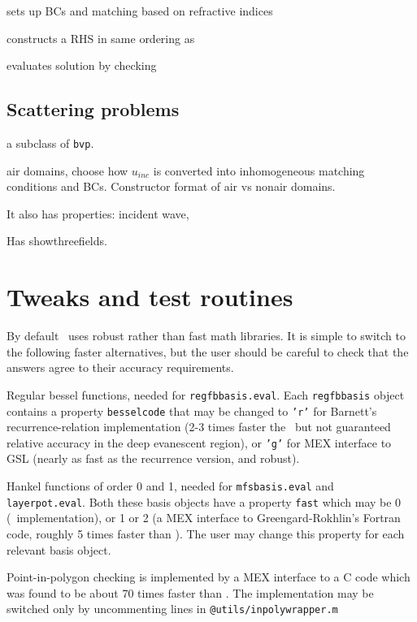 \documentclass[12pt]{article}
\begin{document}
sets up BCs and matching based on refractive indices

constructs a RHS in same ordering as 

evaluates solution by checking 

\subsection{Scattering problems}

a subclass of {\tt bvp}.

air domains, choose how $u_{inc}$ is converted into
inhomogeneous matching conditions and BCs.
Constructor format of air vs nonair domains.

It also has properties: incident wave, 

Has showthreefields.


\section{Tweaks and test routines}

By default \mpspack\ uses robust rather than fast math libraries.
It is simple to switch to the following
faster alternatives, but the user should be careful
to check that the answers agree to their accuracy requirements.
\ben
\item Regular bessel functions, needed for {\tt regfbbasis.eval}.
Each {\tt regfbbasis} object contains a property {\tt besselcode}
that may be changed to {\tt 'r'} for Barnett's recurrence-relation
implementation (2-3 times faster the \matlab\ but
not guaranteed relative accuracy in
the deep evanescent region),
or {\tt 'g'} for MEX interface to GSL (nearly as fast as the recurrence
version, and robust).

\item Hankel functions of order 0 and 1, needed for
{\tt mfsbasis.eval} and {\tt layerpot.eval}. Both these basis objects
have a property {\tt fast} which may be 0 (\matlab\ implementation),
or 1 or 2 (a MEX interface to Greengard-Rokhlin's Fortran code,
roughly 5 times faster than \matlab).
The user may change this property for each relevant basis object.

\item Point-in-polygon checking is implemented by a MEX interface
to a C code which was found to be about 70 times faster than
\matlab. The implementation
may be switched only by uncommenting lines
in {\tt @utils/inpolywrapper.m}
\een
\end{document}
